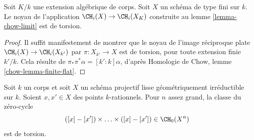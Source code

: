 \begin{lemma}
\label{lemma-kernel-to-closure}
Soit $K/k$ une extension algébrique de corps.
Soit $X$ un schéma de type fini sur $k$.
Le noyau de l'application $\CH_i(X) \to \CH_i(X_K)$
construite au lemme \ref{lemma-chow-limit}
est de torsion.
\end{lemma}

\begin{proof}
Il suffit manifestement de montrer que le noyau
de l'image réciproque plate $\CH_i(X) \to \CH_i(X_{k'})$
par $\pi : X_{k'} \to X$ est de torsion,
pour toute extension finie $k'/k$. Cela résulte de
$\pi_* \pi^* \alpha = [k' : k] \alpha$, d'après
Homologie de Chow, lemme \ref{chow-lemma-finite-flat}.
\end{proof}

\begin{lemma}[Voevodsky]
\label{lemma-smash-nilpotence}
\begin{reference}
\cite{nilpotence}
\end{reference}
Soit $k$ un corps et soit $X$ un schéma projectif lisse
géométriquement irréductible sur $k$. Soient $x, x' \in X$ des points $k$-rationnels.
Pour $n$ assez grand, la classe du zéro-cycle
$$
([x] - [x']) \times \ldots \times ([x] - [x']) \in
\CH_0(X^n)
$$
est de torsion.
\end{lemma}

